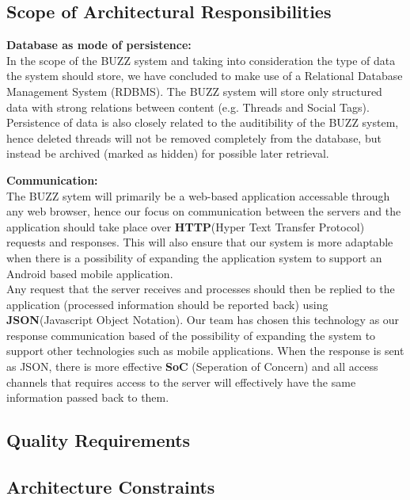 
\subsection{Scope of Architectural Responsibilities}
\begin{flushleft}
	\begin{flushleft}
	\textbf{Database as mode of persistence: } \\
	In the scope of the BUZZ system and taking into consideration the type of data the system should store, we have concluded to make use of a Relational Database Management System (RDBMS). The BUZZ system will store only structured data with strong relations between content (e.g. Threads and Social Tags). Persistence of data is also closely related to the auditibility of the BUZZ system, hence deleted threads will not be removed completely from the database, but instead be archived (marked as hidden) for possible later retrieval.
	\end{flushleft}
	
	\begin{flushleft}
	\textbf{Communication:}\\
	The BUZZ sytem will primarily be a web-based application accessable through any web browser, hence our focus on communication between the servers and the application should take place over \textbf{HTTP}(Hyper Text Transfer Protocol) requests and responses. This will also ensure that our system is more adaptable when there is a possibility of expanding the application system to support an Android based mobile application. \\
	Any request that the server receives and processes should then be replied to the application (processed information should be reported back) using \textbf{JSON}(Javascript Object Notation). Our team has chosen this technology as our response communication based of the possibility of expanding the system to support other technologies such as mobile applications. When the response is sent as JSON, there is more effective \textbf{SoC} (Seperation of Concern) and all access channels that requires access to the server will effectively have the same information passed back to them.
	\end{flushleft}
\end{flushleft}

\subsection{Quality Requirements}
	
	
\subsection{Architecture Constraints}